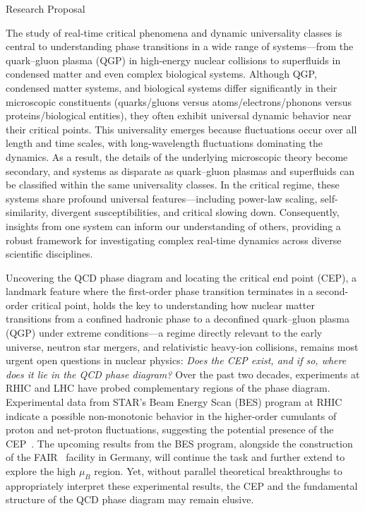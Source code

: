 \documentclass[letterpaper,11pt]{article}
\begin{document}
\begin{center}
    {\LARGE Research Proposal} \\ \vspace{0.in}
\end{center}



The study of real-time critical phenomena and dynamic universality classes is central to understanding phase transitions in a wide range of systems—from the quark–gluon plasma (QGP) in high-energy nuclear collisions to superfluids in condensed matter and even complex biological systems. Although QGP, condensed matter systems, and biological systems differ significantly in their microscopic constituents (quarks/gluons versus atoms/electrons/phonons versus proteins/biological entities), they often exhibit universal dynamic behavior near their critical points. This universality emerges because fluctuations occur over all length and time scales, with long-wavelength fluctuations dominating the dynamics. As a result, the details of the underlying microscopic theory become secondary, and systems as disparate as quark–gluon plasmas and superfluids can be classified within the same universality classes. In the critical regime, these systems share profound universal features—including power-law scaling, self-similarity, divergent susceptibilities, and critical slowing down. Consequently, insights from one system can inform our understanding of others, providing a robust framework for investigating complex real‐time dynamics across diverse scientific disciplines.


Uncovering the QCD phase diagram and locating the critical end point (CEP), a landmark feature where the first-order phase transition terminates in a second-order critical point, holds the key to understanding how nuclear matter transitions from a confined hadronic phase to a deconfined quark–gluon plasma (QGP) under extreme conditions—a regime directly relevant to the early universe, neutron star mergers, and relativistic heavy-ion collisions, remains most urgent open questions in nuclear physics: \textit{Does the CEP exist, and if so, where does it lie in the QCD phase diagram?} Over the past two decades, experiments at RHIC and LHC have probed complementary regions of the phase diagram. Experimental data from STAR's Beam Energy Scan (BES) program at RHIC indicate a possible non-monotonic behavior in the higher-order cumulants of proton and net-proton fluctuations, suggesting the potential presence of the CEP~\cite{STAR:2020tga,STAR:2021fge}. The upcoming results from the BES program, alongside the construction of the FAIR~\cite{Almaalol:2022xwv} facility in Germany, will continue the task and further extend to explore the high $\mu_B$ region. Yet, without parallel theoretical breakthroughs to appropriately interpret these experimental results, the CEP and the fundamental structure of the QCD phase diagram may remain elusive.
\end{document}
